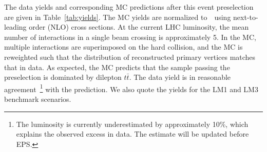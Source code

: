 
The data yields and corresponding MC predictions after this event preselection
are given in Table~\ref{tab:yields}. The MC yields are normalized to~\lumifinal\ using 
next-to-leading order (NLO) cross sections. At the current LHC luminosity, the mean
number of interactions in a single beam crossing is approximately 5. In the MC, multiple interactions
are superimposed on the hard collision, and the MC is reweighted such that the distribution
of reconstructed primary vertices matches that in data. As expected, the MC predicts that the 
sample passing the preselection is dominated by dilepton $t\bar{t}$. The data yield is in 
reasonable agreement~\footnote{The luminosity is currently underestimated by approximately 10\%,
which explains the observed excess in data. The estimate will be updated before EPS.}
 with the prediction. We also quote the yields for
the LM1 and LM3 benchmark scenarios.

